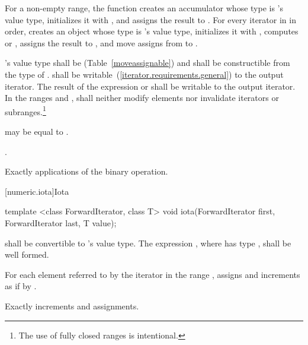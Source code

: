 \begin{itemdescr}
\pnum
\effects For a non-empty range,
the function creates an accumulator  whose type is 's
value type, initializes it with ,
and assigns the result to . For every iterator  in 
in order, creates an object  whose type is 's value type, initializes it
with , computes  or , assigns the result
to , and move assigns from  to .

\pnum
\requires
{}'s value type shall be  (Table~\ref{moveassignable})
and shall be constructible from the type of .  shall be
writable~(\ref{iterator.requirements.general}) to the  output iterator. The result of the expression 
or  shall be writable to the  output iterator.
In the ranges
and
,
shall neither modify elements nor invalidate iterators or
subranges.\footnote{The use of fully closed ranges is intentional.}

\pnum
\remarks
{}
may be equal to
.

\pnum
\returns
{}.

\pnum
\complexity
Exactly
applications of
the binary operation.
\end{itemdescr}

[numeric.iota]{Iota}

%
\begin{itemdecl}
template <class ForwardIterator, class T>
  void iota(ForwardIterator first, ForwardIterator last, T value);
\end{itemdecl}

\begin{itemdescr}
\pnum
\requires {} shall be convertible to 's value
type. The expression , where  has type , shall
be well formed.

\pnum
\effects For each element referred to by the iterator  in the range
, assigns  and increments  as
if by .

\pnum
\complexity Exactly  increments and assignments.
\end{itemdescr}


